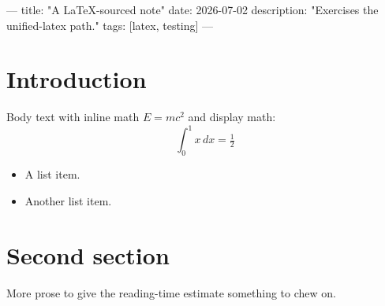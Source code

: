 ---
title: "A LaTeX-sourced note"
date: 2026-07-02
description: "Exercises the unified-latex path."
tags: [latex, testing]
---

\section{Introduction}
Body text with inline math $E = mc^2$ and display math:
\[ \int_0^1 x\,dx = \tfrac12 \]

\begin{itemize}
  \item A list item.
  \item Another list item.
\end{itemize}

\section{Second section}
More prose to give the reading-time estimate something to chew on.
